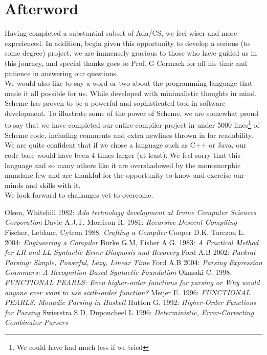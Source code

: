 \documentclass[onecolumn,11pt]{article}
\begin{document}
\section{Afterword}
Having completed a substantial subset of Ada/CS, we feel wiser and more experienced. In addition, begin given this opportunity to develop a serious (to some degree) project, we are immensely gracious to those who have guided us in this journey, and special thanks goes to Prof. G Cormack for all his time and patience in answering our questions. \\

We would also like to say a word or two about the programming language that made it all possible for us. While developed with minimalistic thoughts in mind, Scheme has proven to be a powerful and sophisticated tool in software development. To illustrate some of the power of Scheme, we are somewhat proud to say that we have completed our entire compiler project in under 5000 lines\footnote{We could have had much less if we tried} of Scheme code, including comments and extra newlines thrown in for readability. We are quite confident that if we chose a language such as C++ or Java, our code base would have been 4 times larger (at least). We feel sorry that this language and so many others like it are overshadowed by the monomorphic mundane few and are thankful for the opportunity to know and exercise our minds and skills with it. \\

We look forward to challanges yet to overcome.

\begin{thebibliography}{99}

 Olsen, Whitehill 1982: \emph{Ada technology development at Irvine Computer Sciences Corporation}
 Davie A.J.T, Morrison R. 1981: \emph{Recursive Descent Compiling}
 Fischer, Leblanc, Cytron 1988: \emph{Crafting a Compiler}
 Cooper D.K, Torczon L. 2004: \emph{Engineering a Compiler}
 Burke G.M, Fisher A.G. 1983: \emph{A Practical Method for LR and LL Syntactic Error Diagnosis and Recovery}
 Ford A.B 2002: \emph{Packrat Parsing: Simple, Powerful, Lazy, Linear Time}
 Ford A.B 2004: \emph{Parsing Expression Grammars: A Recognition-Based Syntactic Foundation}
 Okasaki C. 1998: \emph{FUNCTIONAL PEARLS: Even higher-order functions for parsing or Why would anyone ever want to use sixth-order function?}
 Meijer E. 1996: \emph{FUNCTIONAL PEARLS: Monadic Parsing in Haskell}
 Hutton G. 1992: \emph{Higher-Order Functions for Parsing}
 Swierstra S.D, Duponcheel L 1996: \emph{Deterministic, Error-Correcting Combinator Parsers}

\end{thebibliography}
\end{document}
